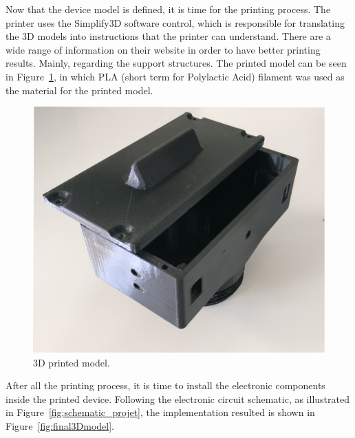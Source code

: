 Now that the device model is defined, it is time for the printing process. The printer uses the Simplify3D software control, which is responsible for translating the 3D models into instructions that the printer can understand. There are a wide range of information on their website in order to have better printing results. Mainly, regarding the support structures. The printed model can be seen in Figure~\ref{fig:3dDPrintedDevice}, in which PLA (short term for Polylactic Acid) filament was used as the material for the printed model.

\begin{figure}[h!]
    \centering
    \includegraphics[scale=0.43]{images/Development/3D_device_development/PrintedModel.pdf}
    \caption{3D printed model.}
    \label{fig:3dDPrintedDevice}
\end{figure}

After all the printing process, it is time to install the electronic components inside the printed device. Following the electronic circuit schematic, as illustrated in Figure~\ref{fig:schematic_projet}, the implementation resulted is shown in Figure~\ref{fig:final3Dmodel}.

